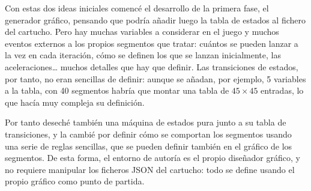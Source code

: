 Con estas dos ideas iniciales comencé el desarrollo de la primera fase,
el generador gráfico, pensando que podría añadir luego la tabla de
estados al fichero del cartucho. Pero hay muchas variables a considerar
en el juego y muchos eventos externos a los propios segmentos que
tratar: cuántos se pueden lanzar a la vez en cada iteración, cómo se
definen los que se lanzan inicialmente, las aceleraciones\ldots{} muchos
detalles que hay que definir. Las transiciones de estados, por tanto, no
eran sencillas de definir: aunque se añadan, por ejemplo, 5 variables a
la tabla, con 40 segmentos habría que montar una tabla de $45 \times 45$
entradas, lo que hacía muy compleja su definición.

Por tanto deseché también una máquina de estados pura junto a su tabla
de transiciones, y la cambié por definir cómo se comportan los
segmentos usando una serie de reglas sencillas, que se pueden definir
también en el gráfico de los segmentos. De esta forma, el entorno de
autoría es el propio diseñador gráfico, y no requiere manipular los
ficheros JSON del cartucho: todo se define usando el propio gráfico
como punto de partida.

\clearpage